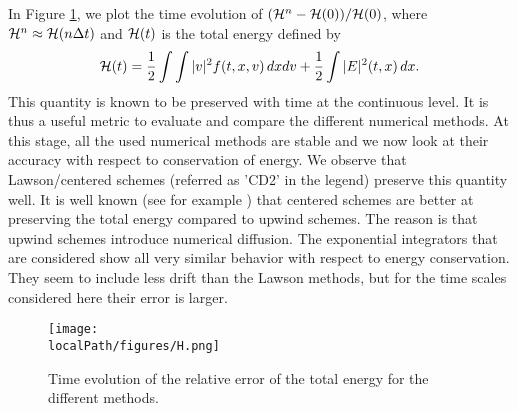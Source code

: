 In Figure \ref{total_energy}, we plot the time evolution of $({\cal H}^n -{\cal H}(0))/{\cal H}(0)$, where ${\cal H}^n\approx {\cal H}(n\Delta t)$ and ${\cal H}(t)$ is the total energy defined by 
$$
{\cal H}(t) = \frac{1}{2}\int\int |v|^2 f(t, x, v) \,dxdv + \frac{1}{2}\int |E|^2(t, x) \,dx. 
$$
This quantity is known to be preserved with time {\color{black} at the continuous level. It is thus a useful metric to evaluate and compare the different numerical 
methods. At this stage, all the used numerical methods are stable and we now look at their accuracy with respect to conservation of energy. }
We observe that Lawson/centered schemes (referred as 'CD2' in the 
legend) preserve this quantity well. It is well known (see for example \cite{Crouseilles:2004}) that centered schemes are better at preserving the total energy compared to upwind schemes. The reason is that upwind schemes introduce numerical diffusion. The exponential integrators that are considered show all very similar behavior with respect to energy conservation. They seem to include less drift than the Lawson methods, but for the time scales considered here their error is larger.

\begin{figure}%
	\centering
  \texttt{[image: \\localPath/figures/H.png]}
	\caption{Time evolution of the relative error of the total energy for the different methods. }
	\label{total_energy}
\end{figure}

